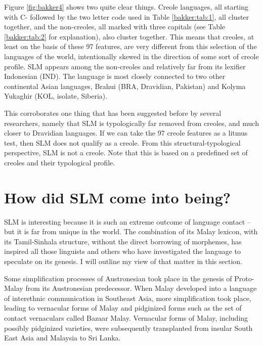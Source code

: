 Figure \ref{fig:bakker4} shows two quite clear things. Creole languages, all starting with C- followed by the two letter code used in Table \ref{bakker:tab:1}, all cluster together, and the non-creoles, all marked with three capitals (see Table \ref{bakker:tab:2} for explanation), also cluster together. This means that creoles, at least on the basis of these 97 features, are very different from this selection of the languages of the world, intentionally skewed in the direction of some sort of creole profile. SLM appears among the non-creoles and relatively far from its lexifier Indonesian (IND). The language is most closely connected to two other continental Asian languages, Brahui (BRA, Dravidian, Pakistan) and Kolyma Yukaghir (KOL, isolate, Siberia). 

This corroborates one thing that has been suggested before by several researchers, namely that SLM is typologically far removed from creoles, and much closer to Dravidian  languages. If we can take the 97 creole features as a litmus test, then SLM does not qualify as a creole. From this structural-typological perspective, SLM is not a creole. Note that this is based on a predefined set of creoles and their typological profile.


\section{How did SLM come into being?}\label{bakker:sec:6}
SLM is interesting because it is such an extreme outcome of language contact -- but it is far from unique in the world. The combination of its Malay lexicon, with its Tamil-Sinhala structure, without the direct borrowing of morphemes, has inspired all those linguists and others who have investigated the language to speculate on its genesis. I will outline my view of that matter in this section.

Some simplification processes of Austronesian took place in the genesis of Proto-Malay from its Austronesian predecessor. When Malay developed into a language of interethnic communication in Southeast Asia, more simplification took place, leading to vernacular forms of Malay and pidginized forms such as the set of contact vernaculars called Bazaar Malay. Vernacular forms of Malay, including possibly pidginized varieties, were subsequently transplanted from insular South East Asia and Malaysia to Sri Lanka.

